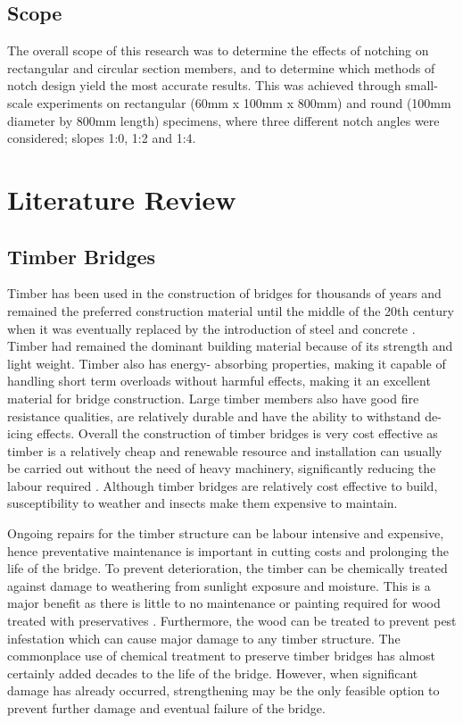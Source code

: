 \documentclass[11pt,a4paper]{article}
\numberwithin{equation}{subsection}
\begin{document}
	\subsection{Scope}
	\noindent
	The overall scope of this research was to determine the effects of notching on rectangular and circular section members, and to determine which methods of notch design yield the most accurate results. This was achieved through small-scale experiments on rectangular (60mm x 100mm x 800mm) and round (100mm diameter by 800mm length) specimens, where three different notch angles were considered; slopes 1:0, 1:2 and 1:4. 
	
	\pagebreak
	
	\section{Literature Review}
	
	\subsection{Timber Bridges}
	Timber has been used in the construction of bridges for thousands of years \cite{ritter_timber_1990} and remained the preferred construction material until the middle of the 20th century when it was eventually replaced by the introduction of steel and concrete \cite{ritter_timber_1990,_timber_2005} . Timber had remained the dominant building material because of its strength and light weight. Timber also has energy- absorbing properties, making it capable of handling short term overloads without harmful effects, making it an excellent material for bridge construction. Large timber members also have good fire resistance qualities, are relatively durable and have the ability to withstand de-icing effects. Overall the construction of timber bridges is very cost effective as timber is a relatively cheap and renewable resource and installation can usually be carried out without the need of heavy machinery, significantly reducing the labour required \cite{ritter_timber_1990}. Although timber bridges are relatively cost effective to build, susceptibility to weather and insects make them expensive to maintain.
	
	\vspace*{\baselineskip}
	
	\noindent
	Ongoing repairs for the timber structure can be labour intensive and expensive, hence preventative maintenance is important in cutting costs and prolonging the life of the bridge. To prevent deterioration, the timber can be chemically treated against damage to weathering from sunlight exposure and moisture. This is a major benefit as there is little to no maintenance or painting required for wood treated with preservatives \cite{ritter_timber_1990}. Furthermore, the wood can be treated to prevent pest infestation \cite{_timber_2005,ritter_timber_1990} which can cause major damage to any timber structure. The commonplace use of chemical treatment to preserve timber bridges has almost certainly added decades to the life of the bridge. However, when significant damage has already occurred, strengthening may be the only feasible option to prevent further damage and eventual failure of the bridge.
	
\end{document}
